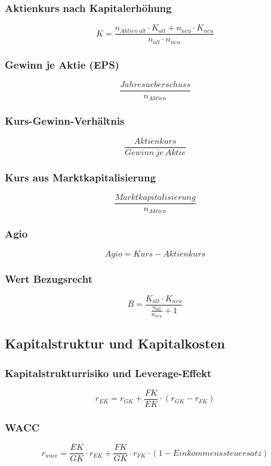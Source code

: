 \subsubsection{Aktienkurs nach Kapitalerhöhung}
\[K = \frac{n_{Aktien~alt} \cdot K_{alt} + n_{neu} \cdot K_{neu}}{n_{alt} \cdot n_{neu}}\]

\subsubsection{Gewinn je Aktie (EPS)}
\[\frac{Jahresueberschuss}{n_{Aktien}}\]

\subsubsection{Kurs-Gewinn-Verhältnis}
\[\frac{Aktienkurs}{Gewinn~je~Aktie}\]

\subsubsection{Kurs aus Marktkapitalisierung}
\[\frac{Marktkapitalisierung}{n_{Aktien}}\]

\subsubsection{Agio}
\[Agio = Kurs - Aktienkurs\]

\subsubsection{Wert Bezugsrecht}
\[B = \frac{K_{alt} \cdot K_{neu}}{\frac{n_{alt}}{n_{neu}}+1}\]


\subsection{Kapitalstruktur und Kapitalkosten}

\subsubsection{Kapitalstrukturrisiko und Leverage-Effekt}
\[r_{EK} = r_{GK} + \frac{FK}{EK} \cdot (r_{GK} - r_{FK})\]

\subsubsection{WACC}
\[r_{wacc} = \frac{EK}{GK} \cdot r_{EK} + \frac{FK}{GK} \cdot r_{FK} \cdot (1-Einkommenssteuersatz)\]

